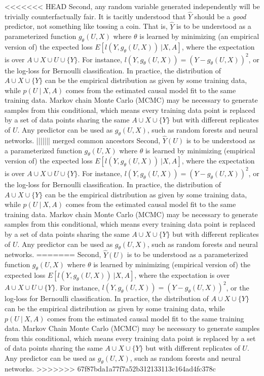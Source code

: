 <<<<<<< HEAD
Second, any random variable generated independently will be trivially counterfactually fair. It is tacitly understood that $\hat Y$ should be a {\it good} predictor, not something like tossing a coin. That is, $\hat Y$ is to be understood as a parameterized function $g_\theta(U, X)$ where $\theta$ is learned by minimizing (an empirical version of) the expected loss $E[l(Y, g_\theta(U, X))\ | X,
  A]$, where the expectation is over $A \cup X \cup U \cup \{Y\}$. For instance, $l(Y, g_\theta(U, X)) = (Y - g_\theta(U, X))^2$, or the log-loss for Bernoulli classification.  In practice, the distribution of $A \cup X \cup \{Y\}$ can be the empirical distribution as given by some training data, while $p(U\ |\ X, A)$ comes from the estimated causal model fit to the same training data. Markov chain Monte Carlo (MCMC) may be necessary to generate samples from this conditional, which means every training data point is replaced by a set of data points sharing the same $A \cup X \cup \{Y\}$ but with different replicates of $U$. Any predictor can be used as $g_\theta(U, X)$, such as random forests and neural networks.
||||||| merged common ancestors
Second, $\hat Y(U)$ is to be understood as a parameterized function $g_\theta(U, X)$ where $\theta$ is learned by minimizing (empirical version of) the expected loss $E[l(Y, g_\theta(U, X))\ | X,
  A]$, where the expectation is over $A \cup X \cup U \cup \{Y\}$. For instance, $l(Y, g_\theta(U, X)) = (Y - g_\theta(U, X))^2$, or the log-loss for Bernoulli classification.  In practice, the distribution of $A \cup X \cup \{Y\}$ can be the empirical distribution as given by some training data, while $p(U\ |\ X, A)$ comes from the estimated causal model fit to the same training data. Markov chain Monte Carlo (MCMC) may be necessary to generate samples from this conditional, which means every training data point is replaced by a set of data points sharing the same $A \cup X \cup \{Y\}$ but with different replicates of $U$. Any predictor can be used as $g_\theta(U, X)$, such as random forests and neural networks.
=======
Second, $\hat Y(U)$ is to be understood as a parameterized function $g_\theta(U, X)$ where $\theta$ is learned by minimizing (empirical version of) the expected loss $E[l(Y, g_\theta(U, X))\ | X,
  A]$, where the expectation is over $A \cup X \cup U \cup \{Y\}$. For instance, $l(Y, g_\theta(U, X)) = (Y - g_\theta(U, X))^2$, or the log-loss for Bernoulli classification.  In practice, the distribution of $A \cup X \cup \{Y\}$ can be the empirical distribution as given by some training data, while $p(U\ |\ X, A)$ comes from the estimated causal model fit to the same training data. Markov Chain Monte Carlo (MCMC) may be necessary to generate samples from this conditional, which means every training data point is replaced by a set of data points sharing the same $A \cup X \cup \{Y\}$ but with different replicates of $U$. Any predictor can be used as $g_\theta(U, X)$, such as random forests and neural networks.
>>>>>>> 67f87bda1a77f7a52b312133113c164ad4fc378c

